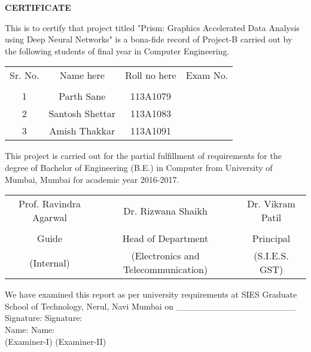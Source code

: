 

\newpage
\thispagestyle{empty}

\begin{center}
\large {\textbf{CERTIFICATE}}\\[0.5cm]
\end{center}

\normalsize This is to certify that project titled "Prism: Graphics Accelerated Data Analysis using Deep Neural Networks" is a bona-fide record of Project-B carried out by the following students of final year in Computer Engineering.\\[1.0cm]

\begin{table}[h]
\centering
\begin{tabular}{c c c c}
Sr. No. & Name here &  Roll no here & Exam No.\\
\\
1 & Parth Sane &  113A1079 \\ 
2 & Santosh Shettar &  113A1083\\
3 & Amish Thakkar &  113A1091 \\
\end{tabular}
\end{table}

\vspace{2cm}

This project is carried out for the partial fulfillment of requirements for the degree of Bachelor of Engineering (B.E.) in Computer from University of Mumbai, Mumbai for academic year 2016-2017.
\vspace{2cm}
\begin{table}[h]
	\centering
	\begin{tabular}{c c c}
		Prof. Ravindra Agarwal & Dr. Rizwana Shaikh &  Dr. Vikram Patil \\
		\\
		Guide & Head of Department & Principal \\ 
		\small (Internal) & \small (Electronics and Telecommunication) &  \small (S.I.E.S. GST)\\
		\hline
	\end{tabular}
\end{table}

We have examined this report as per university requirements at SIES Graduate School of Technology, Nerul, Navi Mumbai on 
\_\_\_\_\_\_\_\_\_\_\_\_\_\_\_\_\_\_\_\\


Signature: \hspace{5.7cm} Signature:  \\

Name:\hspace{6.5cm}  Name: \\

(Examiner-I)  \hspace{5cm}  (Examiner-II) \\

